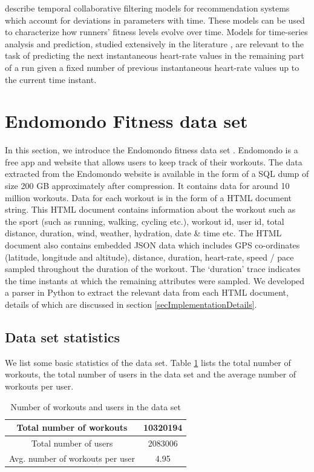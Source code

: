 \documentclass{acm_proc_article-sp}
\begin{document}
\cite{koren1, xiong} describe temporal collaborative filtering models for recommendation systems which account for deviations in parameters with time. These models can be used to characterize how runners' fitness levels evolve over time. Models for time-series analysis and prediction, studied extensively in the literature \cite{timeSeriesStudy, timeSeriesSurvey, autoRegressiveModelWiki}, are relevant to the task of predicting the next instantaneous heart-rate values in the remaining part of a run given a fixed number of previous instantaneous heart-rate values up to the current time instant.

\section{Endomondo Fitness data set}
\label{secDataset}
In this section, we introduce the Endomondo fitness data set \cite{endomondo}. Endomondo \cite{endomondo} is a free app and website that allows users to keep track of their workouts. The data extracted from the Endomondo website \cite{endomondo} is available in the form of a SQL dump of size 200 GB approximately after compression. It contains data for around 10 million workouts. Data for each workout is in the form of a HTML document string. This HTML document contains information about the workout such as the sport (such as running, walking, cycling etc.), workout id, user id, total distance, duration, wind, weather, hydration, date \& time etc. The HTML document also contains embedded JSON data which includes GPS co-ordinates (latitude, longitude and altitude), distance, duration, heart-rate, speed / pace sampled throughout the duration of the workout. The `duration' trace indicates the time instants at which the remaining attributes were sampled. We developed a parser in Python to extract the relevant data from each HTML document, details of which are discussed in section \ref{secImplementationDetails}.

\subsection{Data set statistics}

We list some basic statistics of the data set. Table \ref{tableStatsTotal} lists the total number of workouts, the total number of users in the data set and the average number of workouts per user.

\begin{table}[h]
\centering
\begin{tabular}{|c|c|} \hline
Total number of workouts & 10320194  \\ \hline
Total number of users  &  2083006 \\ \hline
Avg. number of workouts per user & 4.95 \\ \hline
\end{tabular}
\caption{Number of workouts and users in the data set}
\label{tableStatsTotal}
\end{table}
\end{document}
